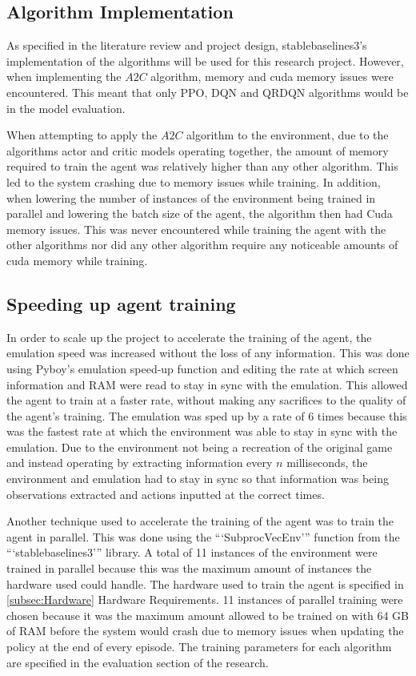 \subsection{Algorithm Implementation}

As specified in the literature review and project design, stablebaselines3's implementation of the algorithms will be used for this research project. However, when implementing the $A2C$ algorithm, memory and cuda memory issues were encountered. This meant that only PPO, DQN and QRDQN algorithms would be in the model evaluation. 

When attempting to apply the $A2C$ algorithm to the environment, due to the algorithms actor and critic models operating together, the amount of memory required to train the agent was relatively higher than any other algorithm. This led to the system crashing due to memory issues while training. In addition, when lowering the number of instances of the environment being trained in parallel and lowering the batch size of the agent, the algorithm then had Cuda memory issues. This was never encountered while training the agent with the other algorithms nor did any other algorithm require any noticeable amounts of cuda memory while training.

\subsection{Speeding up agent training}

In order to scale up the project to accelerate the training of the agent, the emulation speed was increased without the loss of any information. This was done using Pyboy's emulation speed-up function and editing the rate at which screen information and RAM were read to stay in sync with the emulation. This allowed the agent to train at a faster rate, without making any sacrifices to the quality of the agent's training. The emulation was sped up by a rate of 6 times because this was the fastest rate at which the environment was able to stay in sync with the emulation. Due to the environment not being a recreation of the original game and instead operating by extracting information every $n$ milliseconds, the environment and emulation had to stay in sync so that information was being observations extracted and actions inputted at the correct times.

Another technique used to accelerate the training of the agent was to train the agent in parallel. This was done using the ```SubprocVecEnv''' function from the ```stablebaselines3''' library. A total of 11 instances of the environment were trained in parallel because this was the maximum amount of instances the hardware used could handle. The hardware used to train the agent is specified in \ref{subsec:Hardware} Hardware Requirements. 11 instances of parallel training were chosen because it was the maximum amount allowed to be trained on with 64 GB of RAM before the system would crash due to memory issues when updating the policy at the end of every episode. The training parameters for each algorithm are specified in the evaluation section of the research.

